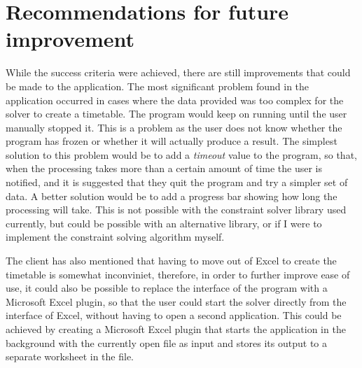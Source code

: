 \documentclass[a4paper, 12pt]{article}
\begin{document}
\section{Recommendations for future improvement}

While the success criteria were achieved, there are still improvements that could be made to
the application. The most significant problem found in the application occurred in cases
where the data provided was too complex for the solver to create a timetable. The program
would keep on running until the user manually stopped it. This is a problem as the user
does not know whether the program has frozen or whether it will actually produce a result.
The simplest solution to this problem would be to add a \emph{timeout} value to the program,
so that, when the processing takes more than a certain amount of time the user is notified,
and it is suggested that they quit the program and try a simpler set of data. A better
solution would be to add a progress bar showing how long the processing will take. This is
not possible with the constraint solver library used currently, but could be possible with
an alternative library, or if I were to implement the constraint solving algorithm myself. 

The client has also mentioned that having to move out of Excel to create the timetable is
somewhat inconviniet, therefore, in order to further improve ease of use, it could also be
possible to replace the interface of the program with a Microsoft Excel plugin, so that the
user could start the solver directly from the interface of Excel, without having to open a
second application. This could be achieved by creating a Microsoft Excel plugin that starts
the application in the background with the currently open file as input and stores its
output to a separate worksheet in the file.
\end{document}
